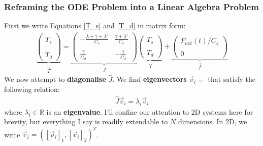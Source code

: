 \subsubsection{Reframing the ODE Problem into a Linear Algebra Problem}
First we write Equations \ref{T_s} and \ref{T_d} in matrix form:
\begin{align}
    \label{T Matrix}
    \underbrace{\left( \begin{array}{c}
        \dot{T}_s \\\\ \dot{T}_d
    \end{array} 
    \right)}_{\dot{\vec{T}}}
    =
    \underbrace{\left( \begin{array}{cc}
        -\frac{\lambda+\gamma+\lambda'}{C_s} & \frac{\gamma+\lambda'}{C_s} \\\\
        \frac{\gamma}{C_d} & -\frac{\gamma}{C_d}
    \end{array}
    \right)}_{\hat{J}}
    \underbrace{\left(  \begin{array}{c}
        T_s \\\\ T_d
    \end{array}
    \right)}_{\vec{T}}
    +
    \underbrace{\left( \begin{array}{c}
        F_{ext}(t)/C_s \\\\ 0
    \end{array}
    \right)}_{\vec{f}}
\end{align}
We now attempt to \textbf{diagonalise} $\hat{J}$. We find \textbf{eigenvectors} $\vec{v}_i=$ that satisfy the following relation:
\begin{align}
    \label{Eigenequation}
    \hat{J}\vec{v}_i=\lambda_i\vec{v}_i
\end{align}
where $\lambda_i\in\mathbb{R}$ is an \textbf{eigenvalue}. I'll confine our attention to 2D systems here for brevity, but everything I say is readily extendable to $N$ dimensions. In 2D, we write $\vec{v}_i=([\vec{v}_i]_1,[\vec{v}_i]_2)^T$. 

